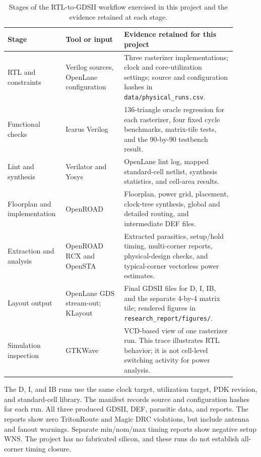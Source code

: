 \documentclass[10pt,a4paper]{article}
\begin{document}
\begin{table}[!htbp]
\centering
\small
\begin{tabular}{p{0.20\linewidth}p{0.24\linewidth}p{0.46\linewidth}}
\toprule
Stage & Tool or input & Evidence retained for this project\\
\midrule
RTL and constraints & Verilog sources, OpenLane configuration & Three
rasterizer implementations; clock and core-utilization settings; source and
configuration hashes in \texttt{data/physical\_runs.csv}.\\
Functional checks & Icarus Verilog & 136-triangle oracle regression for
each rasterizer, four fixed cycle benchmarks, matrix-tile tests, and the
90-by-90 testbench result.\\
Lint and synthesis & Verilator and Yosys & OpenLane lint log, mapped
standard-cell netlist, synthesis statistics, and cell-area results.\\
Floorplan and implementation & OpenROAD & Floorplan, power grid, placement,
clock-tree synthesis, global and detailed routing, and intermediate DEF
files.\\
Extraction and analysis & OpenROAD RCX and OpenSTA & Extracted parasitics,
setup/hold timing, multi-corner reports, physical-design checks, and
typical-corner vectorless power estimates.\\
Layout output & OpenLane GDS stream-out; KLayout & Final GDSII files for D,
I, IB, and the separate 4-by-4 matrix tile; rendered figures in
\texttt{research\_report/figures/}.\\
Simulation inspection & GTKWave & VCD-based view of one rasterizer run.
This trace illustrates RTL behavior; it is not cell-level switching
activity for power analysis.\\
\bottomrule
\end{tabular}
\caption{Stages of the RTL-to-GDSII workflow exercised in this project and
the evidence retained at each stage.}
\label{tab:workflow}
\end{table}

The D, I, and IB runs use the same clock target, utilization target, PDK
revision, and standard-cell library. The manifest records source and
configuration hashes for each run. All three produced GDSII, DEF, parasitic
data, and reports. The reports show zero TritonRoute and Magic DRC
violations, but include antenna and fanout warnings. Separate min/nom/max
timing reports show negative setup WNS. The project has no fabricated
silicon, and these runs do not establish all-corner timing closure.
\end{document}
